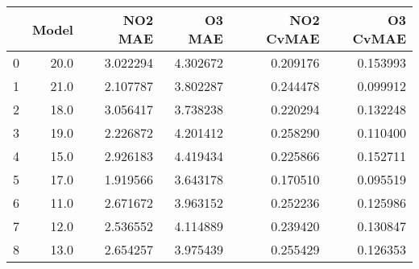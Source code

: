 \begin{tabular}{lrrrrr}
\toprule
{} &  Model &   NO2 MAE &    O3 MAE &  NO2 CvMAE &  O3 CvMAE \\
\midrule
0 &   20.0 &  3.022294 &  4.302672 &   0.209176 &  0.153993 \\
1 &   21.0 &  2.107787 &  3.802287 &   0.244478 &  0.099912 \\
2 &   18.0 &  3.056417 &  3.738238 &   0.220294 &  0.132248 \\
3 &   19.0 &  2.226872 &  4.201412 &   0.258290 &  0.110400 \\
4 &   15.0 &  2.926183 &  4.419434 &   0.225866 &  0.152711 \\
5 &   17.0 &  1.919566 &  3.643178 &   0.170510 &  0.095519 \\
6 &   11.0 &  2.671672 &  3.963152 &   0.252236 &  0.125986 \\
7 &   12.0 &  2.536552 &  4.114889 &   0.239420 &  0.130847 \\
8 &   13.0 &  2.654257 &  3.975439 &   0.255429 &  0.126353 \\
\bottomrule
\end{tabular}
